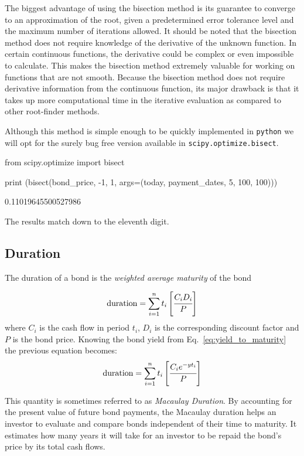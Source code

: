 The biggest advantage of using the bisection method is its guarantee to converge to an approximation of the root, given a predetermined error tolerance level and the maximum number of iterations allowed. It should be noted that the bisection method does not require knowledge of the derivative of the unknown function. In certain continuous functions, the derivative could be complex or even impossible to calculate. This makes the bisection method extremely valuable for working on functions that are not smooth.
Because the bisection method does not require derivative information from the continuous function, its major drawback is that it takes up more computational time in the iterative evaluation as compared to other root-finder methods. 

Although this method is simple enough to be quickly implemented in \texttt{python} we will opt for the surely bug free version available in \texttt{scipy.optimize.bisect}.

\begin{ipython}
from scipy.optimize import bisect

print (bisect(bond_price, -1, 1, args=(today, payment_dates, 5, 100, 100)))
\end{ipython}
\begin{ioutput}
0.11019645500527986
\end{ioutput}

\noindent
The results match down to the eleventh digit.

\subsection{Duration}
The duration of a bond is the \emph{weighted average maturity} of the bond

\begin{equation}
\textrm{duration} = \sum_{i=1}^{n} t_i \left[\cfrac{C_i D_i}{P}\right] 
\end{equation}
where $C_i$ is the cash flow in period $t_i$, $D_i$ is the corresponding discount factor and $P$ is the bond price.
Knowing the bond yield from Eq.~\ref{eq:yield_to_maturity} the previous equation becomes:
\begin{equation}
\textrm{duration} = \sum_{i=1}^{n} t_i \left[\cfrac{C_i e^{-yt_i}}{P}\right] 
\label{eq:duration}
\end{equation}

This quantity is sometimes referred to as \emph{Macaulay Duration}. By accounting for the present value of future bond payments, the Macaulay duration helps an investor to evaluate and compare bonds independent of their time to maturity.
It estimates how many years it will take for an investor to be repaid the bond’s price by its total cash flows.

